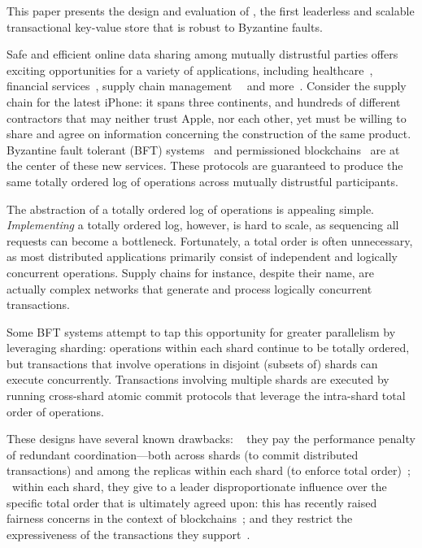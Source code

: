 This paper presents the design and evaluation of \sys{}, the first leaderless and scalable transactional key-value store that is robust to Byzantine faults.

Safe and efficient online data sharing among mutually distrustful
parties offers exciting opportunities for a variety of applications,
including healthcare~\cite{}, financial services~\cite{}, supply chain
management~~\cite{} and more~\cite{}. Consider the supply chain for the latest iPhone: it spans three continents, and hundreds of different contractors \cite{AppleSup} that may neither trust Apple, nor each other, yet must be willing to share and agree on information concerning the construction of the same product.
Byzantine fault tolerant (BFT)
systems~\cite{castro1999practical,martin2006fast,kotla2007zyzzyva,  gueta2018sbft,clement2009making,buchman2016tendermint,yin2019hotstuff,Clement09Upright,duan2014hbft, pires2018generalized,bessani2014state,lamport2011byzantizing,arun2019ezbft, malkhi2019flexible,duan2014hbft,yin2003separating, Guerraoui08Next, Kotla04High,liskov2010viewstamped} and permissioned blockchains~\cite{Hyperledger,EthereumQuorum, buchman2016tendermint, al2017chainspace,kokoris2018omniledger,gilad2017algorand, baudet2019state} are at the center of these new services. These protocols are guaranteed to
produce the same totally ordered log of operations across mutually distrustful
participants. 

The abstraction of a totally ordered log of operations is appealing simple. {\em Implementing} a totally ordered log, however, is hard to scale, as sequencing all requests can become a bottleneck.  Fortunately, a total order is  often unnecessary, as most distributed applications primarily consist of independent and logically concurrent operations. Supply chains for instance, despite their name, are actually complex networks that generate and process logically concurrent transactions. 

Some BFT systems attempt to tap this opportunity for greater parallelism by leveraging sharding: operations within each shard continue to be totally ordered, but transactions that involve operations in disjoint (subsets of) shards can execute concurrently. Transactions involving  multiple shards are executed by running cross-shard atomic commit protocols that leverage the intra-shard total order of operations. 

These designs have several known drawbacks: \one~ they pay the performance penalty of  redundant coordination---both across shards (to commit distributed transactions) and among the replicas within each shard (to enforce total order)~\cite{tapir}; \two~within each shard,  they give to a leader disproportionate influence over the specific total order that  is ultimately agreed upon: this has recently raised fairness concerns in the context of blockchains~\cite{}; and they restrict the expressiveness of the transactions they support~\cite{}.

